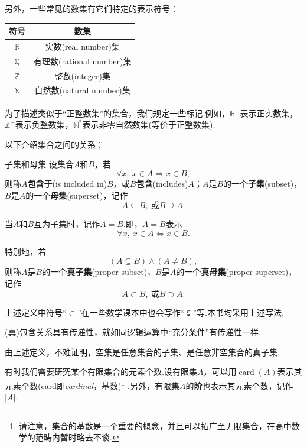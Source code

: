 \documentclass[lang=cn, zihao=5]{elegantbook}
\newcommand{\R}{\mathbb{R}}
\DeclareMathOperator{\card}{card}
\begin{document}
另外，一些常见的数集有它们特定的表示符号：

\begin{table}[h]
	\centering
	\renewcommand\arraystretch{1.3}
	\begin{tabular}{cc}
		\toprule
		符号           & 数集                    \\
		\midrule
		$\R$         & 实数(real number)集      \\
		$\mathbb{Q}$ & 有理数(rational number)集 \\
		$\mathbb{Z}$ & 整数(integer)集          \\
		$\mathbb{N}$ & 自然数(natural number)集 \\
		\bottomrule
	\end{tabular}
\end{table}

为了描述类似于“正整数集”的集合，我们规定一些标记.例如，$\R ^{+}$表示正实数集，$\mathbb{Z}^{-}$表示负整数集，$\mathbb{N}^{*}$表示非零自然数集(等价于正整数集).

以下介绍集合之间的关系：

\begin{definition}{子集和母集}
	设集合$A$和$B$，若$$\forall x,~x \in A \Rightarrow x \in B,$$
	则称$A$\textbf{包含于}(is included in)$B$，或$B$\textbf{包含}(includes)$A$；$A$是$B$的一个\textbf{子集}(subset)，$B$是$A$的一个\textbf{母集}(superset)，记作$$A \subseteq B,~ \text{或} B \supseteq A.$$
	
	当$A$和$B$互为子集时，记作$A=B$.即，$A=B$表示$$\forall x,~ x \in A \Leftrightarrow x \in B.$$
	
	特别地，若$$(A \subseteq B) \wedge (A \neq B),$$则称$A$是$B$的一个\textbf{真子集}(proper subset)，$B$是$A$的一个\textbf{真母集}(proper superset)，记作$$A \subset B,~ \text{或} B \supset A.$$
\end{definition}
\begin{note}
	上述定义中符号“$\subset$”在一些数学课本中也会写作“$\subsetneqq$”等.本书均采用上述写法.
\end{note}
\begin{remark}
	(真)包含关系具有传递性，就如同逻辑运算中“充分条件”有传递性一样.
\end{remark}

由上述定义，不难证明，空集是任意集合的子集、是任意非空集合的真子集.

有时我们需要研究某个有限集合的元素个数.设有限集$A$，可以用$\card (A)$表示其元素个数(card即\textit{cardinal}，基数)\footnote{请注意，集合的基数是一个重要的概念，并且可以拓广至无限集合，在高中数学的范畴内暂时略去不谈.} .另外，有限集$A$的\textbf{阶}也表示其元素个数，记作$|A|$.
\end{document}
